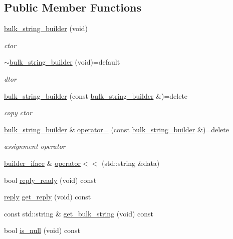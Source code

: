 \subsection*{Public Member Functions}
\begin{DoxyCompactItemize}
\item 
\hyperlink{classcpp__redis_1_1builders_1_1bulk__string__builder_a1c0bee3cd6fbafc782cfe93c0b650451}{bulk\+\_\+string\+\_\+builder} (void)
\begin{DoxyCompactList}\small\item\em ctor \end{DoxyCompactList}\item 
\hyperlink{classcpp__redis_1_1builders_1_1bulk__string__builder_a88c7142bab456f70da9f9a6252e2affb}{$\sim$bulk\+\_\+string\+\_\+builder} (void)=default
\begin{DoxyCompactList}\small\item\em dtor \end{DoxyCompactList}\item 
\hyperlink{classcpp__redis_1_1builders_1_1bulk__string__builder_ac3bd10f8972fa1856b6e7b7262ecd98f}{bulk\+\_\+string\+\_\+builder} (const \hyperlink{classcpp__redis_1_1builders_1_1bulk__string__builder}{bulk\+\_\+string\+\_\+builder} \&)=delete
\begin{DoxyCompactList}\small\item\em copy ctor \end{DoxyCompactList}\item 
\hyperlink{classcpp__redis_1_1builders_1_1bulk__string__builder}{bulk\+\_\+string\+\_\+builder} \& \hyperlink{classcpp__redis_1_1builders_1_1bulk__string__builder_a972355e0910faa9e3daf4f5c67c3e581}{operator=} (const \hyperlink{classcpp__redis_1_1builders_1_1bulk__string__builder}{bulk\+\_\+string\+\_\+builder} \&)=delete
\begin{DoxyCompactList}\small\item\em assignment operator \end{DoxyCompactList}\item 
\hyperlink{classcpp__redis_1_1builders_1_1builder__iface}{builder\+\_\+iface} \& \hyperlink{classcpp__redis_1_1builders_1_1bulk__string__builder_a43000357f87212f657aafe279a92b541}{operator$<$$<$} (std\+::string \&data)
\item 
bool \hyperlink{classcpp__redis_1_1builders_1_1bulk__string__builder_a4d80d8dfe305e35aca8b4ec84c56fbea}{reply\+\_\+ready} (void) const
\item 
\hyperlink{classcpp__redis_1_1reply}{reply} \hyperlink{classcpp__redis_1_1builders_1_1bulk__string__builder_a56d6d3089107a1bccd63f6a5267c16cb}{get\+\_\+reply} (void) const
\item 
const std\+::string \& \hyperlink{classcpp__redis_1_1builders_1_1bulk__string__builder_a6b3e70acab5c115609db774becbcc571}{get\+\_\+bulk\+\_\+string} (void) const
\item 
bool \hyperlink{classcpp__redis_1_1builders_1_1bulk__string__builder_a2a6ab893dbe5ad2433df18ce62ca6211}{is\+\_\+null} (void) const
\end{DoxyCompactItemize}
